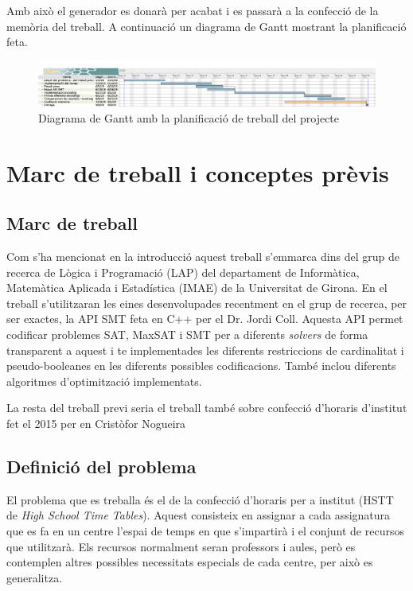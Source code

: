 \documentclass[11pt,a4paper,twoside]{report}
\begin{document}
  Amb això el generador es donarà per acabat i es passarà a la confecció de la memòria del treball. 
  A continuació un diagrama de Gantt mostrant la planificació feta.



  \begin{figure}
    \centering
    \includegraphics[angle=90,origin=c,height=0.58\textheight]{Diagrames/gantt1.png} 
    \caption{Diagrama de Gantt amb la planificació de treball del projecte}
    \label{fig:Gantt}
  \end{figure}




  \chapter{Marc de treball i conceptes prèvis}
  \section{Marc de treball}
    Com s'ha mencionat en la introducció aquest treball s'emmarca dins del grup de recerca de Lògica i Programació (LAP) del departament de Informàtica, Matemàtica Aplicada i Estadística (IMAE) de la Universitat de Girona. 
    En el treball s'utilitzaran les eines desenvolupades recentment en el grup de recerca, per ser exactes, la API SMT feta en C++ per el Dr. Jordi Coll. 
    Aquesta API permet codificar problemes SAT, MaxSAT i SMT per a diferents \textit{solvers} de forma transparent a aquest i te implementades les diferents restriccions de cardinalitat i pseudo-booleanes en les diferents possibles codificacions. 
    També inclou diferents algoritmes d'optimització implementats.

    La resta del treball previ seria el treball també sobre confecció d'horaris d'institut fet el 2015 per en Cristòfor Nogueira\cite{treballCristo}

  \section{Definició del problema}
    El problema que es treballa és el de la confecció d'horaris per a institut (HSTT de \textit{High School Time Tables}). 
    Aquest consisteix en assignar a cada assignatura que es fa en un centre l'espai de temps en que s'impartirà i el conjunt de recursos que utilitzarà. 
    Els recursos normalment seran professors i aules, però es contemplen altres possibles necessitats especials de cada centre, per això es generalitza.
\end{document}
